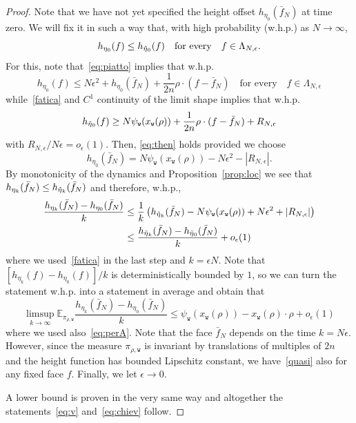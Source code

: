 \documentclass[10pt]{amsart}
\theoremstyle{definition}\newtheorem{defi}[theo]{Definition}\newtheorem{rema}[theo]{Remark}\newtheorem{exam}[theo]{Example}\newtheorem{exem}[theo]{Example}\newtheorem{nota}[theo]{Notation}
\newcommand{\ttw}{\mathtt{w}}
\newcommand{\bbE}{\mathbb{E}}
\let\oldtilde\tilde
\renewcommand*{\tilde}[1]{\mathchoice{\widetilde{#1}}{\widetilde{#1}}{\oldtilde{#1}}{\oldtilde{#1}}}
\begin{document}
\begin{proof}
Note that we have not yet specified the height offset $h_{\eta_0}(\bar f_N)$ at time zero. We will fix it in such a way that, with high probability (w.h.p.) as $N\to\infty$,
\begin{equation}\label{eq:then}
h_{\eta_0}(f)\le h_{\tilde \eta_0}(f) \quad \text{for every} \quad f\in \Lambda_{N,\epsilon}.
\end{equation}
For this, note that~\eqref{eq:piatto} implies that w.h.p.
\begin{equation}
h_{\eta_0}(f)\le N\epsilon^2+h_{\eta_0}(\bar f_N)+\frac1{2n}\rho\cdot(f-\bar f_N) \quad \text{for every} \quad f\in \Lambda_{N,\epsilon}
\end{equation}
while~\eqref{fatica} and $C^1$ continuity of the limit shape implies that w.h.p.
\begin{equation}
h_{\tilde \eta_0}(f)\ge N\psi_{\ttw}(x_{\ttw}(\rho))+\frac1{2n}\rho\cdot(f-\bar f_N)+R_{N,\epsilon}
\end{equation}
with $R_{N,\epsilon}/N\epsilon= o_\epsilon(1)$. Then, \eqref{eq:then} holds provided we choose
\[
h_{\eta_0}(\bar f_N)=N\psi_{\ttw}(x_{\ttw}(\rho))-N\epsilon^2-\left|R_{N,\epsilon}\right|.
\]
By monotonicity of the dynamics and Proposition~\ref{prop:loc} we see that $h_{\eta_k}(\bar f_N)\le h_{\tilde\eta_k}(\bar f_N)$ and therefore, w.h.p.,
\begin{equation}
\begin{aligned}
\frac{h_{\eta_k}(\bar f_N)-h_{\eta_0}(\bar f_N)}k&\le \frac1k\left(h_{\tilde\eta_k}(\bar f_N)-N\psi_{\ttw}(x_{\ttw}(\rho))+N\epsilon^2+\left|R_{N,\epsilon}\right|\right)
\\
&\le \frac{h_{\tilde\eta_k}(\bar f_N)- h_{\tilde\eta_0}(\bar f_N)}k+o_\epsilon(1)
\end{aligned}
\end{equation}
where we used~\eqref{fatica} in the last step and $k=\epsilon N$. Note that $[h_{\eta_k}(f)-h_{\eta_0}(f)]/k$ is deterministically bounded by $1$, so we can turn the statement w.h.p. into a statement in average and obtain that
\begin{equation}\label{quasi}
\limsup_{k\to\infty}
\bbE_{\pi_{\rho,\ttw}}\frac{h_{\eta_k}(\bar f_N)-h_{\eta_0}(\bar f_N)}k\le\psi_{\ttw}(x_{\ttw}(\rho))-x_{\ttw}(\rho)\cdot \rho+o_\epsilon(1)
\end{equation}
where we used also~\eqref{eq:perA}. Note that the face $\bar f_N$ depends on the time $k=N\epsilon$. However, since the measure $\pi_{\rho,\ttw}$ is invariant by translations of multiples of $2n$ and the height function has bounded Lipschitz constant, we have~\eqref{quasi} also for any fixed face $f$. Finally, we let $\epsilon\to0$.

A lower bound is proven in the very same way and altogether the statements~\eqref{eq:v} and~\eqref{eq:chiev} follow.
\end{proof}
\end{document}
